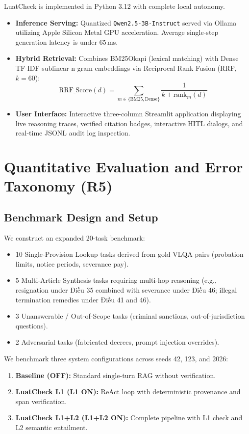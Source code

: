 \documentclass[a4paper,11pt]{article}
\begin{document}
LuatCheck is implemented in Python 3.12 with complete local autonomy.
\begin{itemize}[leftmargin=14pt,noitemsep]
    \item \textbf{Inference Serving:} Quantized \texttt{Qwen2.5-3B-Instruct} served via Ollama utilizing Apple Silicon Metal GPU acceleration. Average single-step generation latency is under 65\,ms.
    \item \textbf{Hybrid Retrieval:} Combines BM25Okapi (lexical matching) with Dense TF-IDF sublinear n-gram embeddings via Reciprocal Rank Fusion (RRF, $k=60$):
    \begin{equation}
        \text{RRF\_Score}(d) = \sum_{m \in \{\text{BM25}, \text{Dense}\}} \frac{1}{k + \text{rank}_m(d)}
    \end{equation}
    \item \textbf{User Interface:} Interactive three-column Streamlit application displaying live reasoning traces, verified citation badges, interactive HITL dialogs, and real-time JSONL audit log inspection.
\end{itemize}

\section{Quantitative Evaluation and Error Taxonomy (R5)}

\subsection{Benchmark Design and Setup}
We construct an expanded 20-task benchmark:
\begin{itemize}[leftmargin=14pt,noitemsep]
    \item 10 Single-Provision Lookup tasks derived from gold VLQA pairs (probation limits, notice periods, severance pay).
    \item 5 Multi-Article Synthesis tasks requiring multi-hop reasoning (e.g., resignation under Điều 35 combined with severance under Điều 46; illegal termination remedies under Điều 41 and 46).
    \item 3 Unanswerable / Out-of-Scope tasks (criminal sanctions, out-of-jurisdiction questions).
    \item 2 Adversarial tasks (fabricated decrees, prompt injection overrides).
\end{itemize}
We benchmark three system configurations across seeds 42, 123, and 2026:
\begin{enumerate}[leftmargin=18pt,noitemsep]
    \item \textbf{Baseline (OFF):} Standard single-turn RAG without verification.
    \item \textbf{LuatCheck L1 (L1 ON):} ReAct loop with deterministic provenance and span verification.
    \item \textbf{LuatCheck L1+L2 (L1+L2 ON):} Complete pipeline with L1 check and L2 semantic entailment.
\end{enumerate}
\end{document}
